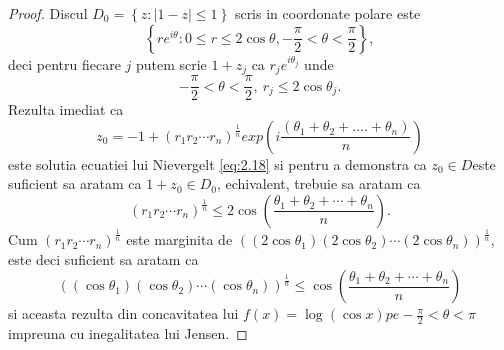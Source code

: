 \documentclass[a4paper,12pt,oneside]{report}
\begin{document}
\begin{proof}
Discul \(D_{0} = \left \{ z : \left | 1 - z \right |\leq 1 \right \}\) scris in coordonate polare este
\begin{displaymath}
    \left \{ re^{i\theta }: 0 \leq r\leq 2\cos\theta , -\frac{\pi }{2}< \theta  < \frac{\pi }{2} \right \},
\end{displaymath}
deci pentru fiecare \(j\) putem scrie \(1 + z_{j}\) ca \(r_{j}e^{i\theta _{j}}\) unde \[-\frac{\pi }{2}< \theta  < \frac{\pi }{2},~r_{j}\leq 2\cos\theta _{j}.\]
 Rezulta imediat ca \[z_{0} = -1 + \left ( r_{1} r_{2}\cdots r_{n}\right )^{\frac{1}{n}}exp\left ( i\frac{\left ( \theta _{1} + \theta _{2} +....+ \theta _{n} \right )}{n} \right )\] este solutia ecuatiei lui Nievergelt \ref{eq:2.18} si pentru a demonstra ca \(z_{0}\in D \)este suficient sa aratam ca \(1 + z_{0}\in D_{0}\), echivalent, trebuie sa aratam ca
\begin{displaymath}
    \left ( r_{1} r_{2} \cdots r_{n}\right )^{\frac{1}{n}}\leq 2\cos\left ( \frac{\theta _{1} + \theta _{2}+\cdots+\theta _{n}}{n} \right ) \label{eq:2.19} \tag{2.19}.
\end{displaymath}
Cum \(\left ( r_{1} r_{2} \cdots r_{n}\right )^{\frac{1}{n}}\) este marginita de \(\left ( \left (2\cos\theta _{1}  \right )\left ( 2\cos\theta _{2} \right )\cdots \left (2\cos\theta _{n}  \right ) \right )^{\frac{1}{n}}\), este deci suficient sa aratam ca
\begin{displaymath}
    \left ( \left (\cos\theta _{1}  \right )\left ( \cos\theta _{2} \right )\cdots \left (\cos\theta _{n}  \right ) \right )^{\frac{1}{n}}\leq \cos\left ( \frac{\theta _{1} + \theta _{2}+\cdots+\theta _{n}}{n} \right )
\end{displaymath}
si aceasta rezulta din concavitatea lui \(f\left ( x \right ) = \log \left ( \cos x \right ) pe -\frac{\pi }{2}< \theta < \pi\) impreuna cu inegalitatea lui Jensen.
\end{proof}
\end{document}
